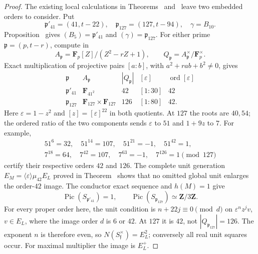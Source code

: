 \begin{proof}
The existing local calculations in Theorems~
and~ leave two embedded orders to consider.
Put
\[
 \mathfrak p'_{41}=(41,t-22),\quad
 \mathfrak p_{127}=(127,t-94),\quad \gamma=B_{10}.
\]
Proposition~ gives
$(B_5)=\mathfrak p'_{41}$ and $(\gamma)=\mathfrak p_{127}$.
For either prime $\mathfrak p=(p,t-r)$, compute in
\[
 A_{\mathfrak p}=\mathbf F_p[Z]/(Z^2-rZ+1),\qquad
 Q_{\mathfrak p}=A_{\mathfrak p}^{\times}/\mathbf F_p^{\times}.
\]
Exact multiplication of projective pairs $[a:b]$, with
$a^2+rab+b^2\ne0$, gives
\[
\begin{array}{c|l|r|c|r}
\mathfrak p&A_{\mathfrak p}&|Q_{\mathfrak p}|&
 [\varepsilon]&\operatorname{ord}[\varepsilon]\\\hline
\mathfrak p'_{41}&\mathbf F_{41^2}&42&[1:30]&42\\
\mathfrak p_{127}&\mathbf F_{127}\times\mathbf F_{127}&126&[1:80]&42.
\end{array}
\]
Here $\varepsilon=1-z^2$ and $[z]=[\varepsilon]^{22}$ in both
quotients.  At $127$ the roots are $40,54$; the ordered ratio of the
two components sends $\varepsilon$ to $51$ and $1+9z$ to $7$.
For example,
\[
\begin{gathered}
 51^6=32,\quad51^{14}=107,\quad51^{21}=-1,\quad51^{42}=1,\\
 7^{18}=64,\quad7^{42}=107,\quad7^{63}=-1,\quad7^{126}=1
 \pmod{127}
\end{gathered}
\]
certify their respective orders $42$ and $126$.
The complete unit generation $E_M=\langle\varepsilon\rangle\mu_{42}E_L$
proved in Theorem~ shows that no omitted global
unit enlarges the order-$42$ image.  The conductor exact sequence
and $h(M)=1$ give
\[
 \operatorname{Pic}(S_{\mathfrak p'_{41}})=1,
 \qquad \operatorname{Pic}(S_{\mathfrak p_{127}})\simeq\mathbf Z/3\mathbf Z.
\]
For every proper order here, the unit condition is
$n+22j\equiv0\pmod d$ on $\varepsilon^n z^j v$, $v\in E_L$,
where the image order $d$ is $6$ or $42$.  At $127$ it is $42$,
not $|Q_{\mathfrak p_{127}}|=126$.  The exponent $n$ is therefore
even, so $N(S_{\mathfrak f}^{\times})=E_L^2$; conversely all real
unit squares occur.  For maximal multiplier the image is $E_L^+$.


\end{proof}

